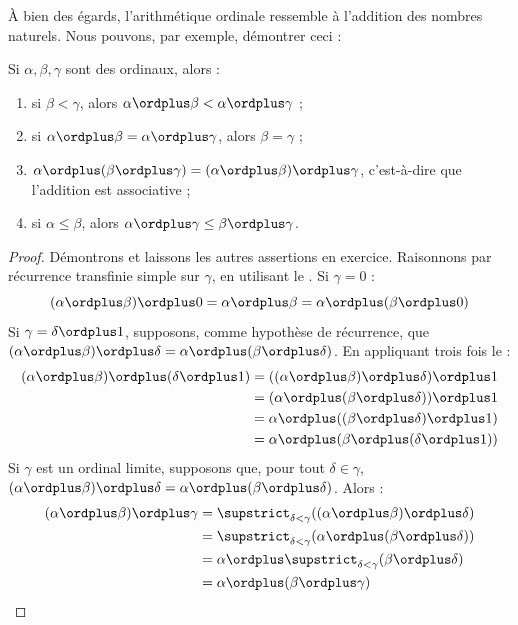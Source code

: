 \documentclass[../../../include/open-logic-section]{subfiles}
\begin{document}
À bien des égards, l'arithmétique ordinale ressemble
à l'addition des nombres naturels. Nous pouvons,
par exemple, démontrer ceci :

\begin{lem}
Si $\alpha, \beta, \gamma$ sont des ordinaux, alors :
\begin{enumerate}
	\item{} si $\beta < \gamma$,
	alors $\alpha \ordplus \beta <
	\alpha \ordplus \gamma$ ;
	\item{} si
	$\alpha \ordplus \beta =
	\alpha\ordplus \gamma$, alors
	$\beta = \gamma$ ;
	\item{}
	$\alpha \ordplus (\beta \ordplus \gamma)
	= (\alpha \ordplus \beta) \ordplus \gamma$,
	c'est-à-dire que l'addition est associative ;
	\item{} si
	$\alpha \leq \beta$, alors
	$\alpha \ordplus \gamma
	\leq \beta \ordplus \gamma$.
\end{enumerate}
\end{lem}

\begin{proof}
Démontrons  et laissons les autres
assertions en exercice. Raisonnons par récurrence
transfinie simple sur $\gamma$, en utilisant
le . Si $\gamma = 0$ :
\[
(\alpha \ordplus \beta) \ordplus 0
= \alpha \ordplus \beta
= \alpha \ordplus (\beta \ordplus 0)
\]
Si $\gamma = \delta\ordplus 1$, supposons, comme
hypothèse de récurrence, que
$(\alpha \ordplus \beta) \ordplus \delta =
\alpha \ordplus (\beta \ordplus \delta)$.
En appliquant trois fois le  :
\begin{align*}
	(\alpha \ordplus \beta) \ordplus (\delta \ordplus 1)
	&= ((\alpha \ordplus \beta) \ordplus \delta)
	\ordplus 1\\
	&= (\alpha \ordplus (\beta \ordplus \delta))
	\ordplus 1\\
	&= \alpha \ordplus ((\beta \ordplus \delta)
	\ordplus 1)\\
	&= \alpha \ordplus (\beta \ordplus
	(\delta\ordplus 1))
\end{align*}
Si $\gamma$ est un ordinal limite, supposons que,
pour tout $\delta \in \gamma$,
$(\alpha \ordplus \beta) \ordplus \delta =
\alpha \ordplus (\beta \ordplus \delta)$.
Alors :
\begin{align*}
	(\alpha \ordplus \beta) \ordplus \gamma
	&= \supstrict_{\delta < \gamma}
	((\alpha \ordplus \beta) \ordplus \delta)\\
	&= \supstrict_{\delta < \gamma}
	(\alpha \ordplus (\beta \ordplus \delta))\\
	&= \alpha \ordplus \supstrict_{\delta < \gamma}
	(\beta \ordplus \delta)\\
	&= \alpha \ordplus (\beta \ordplus \gamma)
\end{align*}
\end{proof}
\end{document}
